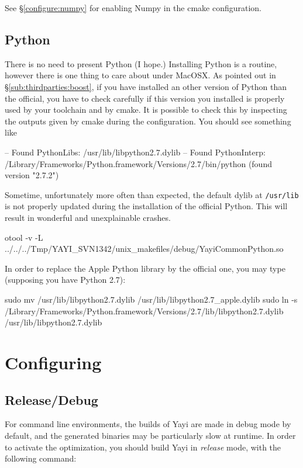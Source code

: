See \S \ref{configure:numpy} for enabling Numpy in the cmake configuration.


\subsection{Python}
\label{sub:python}
There is no need to present Python (I hope.) Installing Python is a routine, however there is one thing to care about under MacOSX. As pointed out in \S \ref{sub:thirdparties:boost}, if you have installed an other version of Python than the official, you have to check carefully if this version you installed is properly used by your toolchain and by cmake. It is possible to check this by inspecting the outputs given by cmake during the configuration. You should see something like

\begin{bash}
-- Found PythonLibs: /usr/lib/libpython2.7.dylib 
-- Found PythonInterp: /Library/Frameworks/Python.framework/Versions/2.7/bin/python (found version "2.7.2")
\end{bash}

Sometime, unfortunately more often than expected, the default dylib at \lstinline|/usr/lib| is not properly updated during the installation of the official Python. This will result in wonderful and unexplainable crashes. 


\begin{bash}
otool -v -L ../../../Tmp/YAYI_SVN1342/unix_makefiles/debug/YayiCommonPython.so
\end{bash}

In order to replace the Apple Python library by the official one, you may type (supposing you have Python 2.7):
\begin{bash}
sudo mv /usr/lib/libpython2.7.dylib /usr/lib/libpython2.7_apple.dylib
sudo ln -s /Library/Frameworks/Python.framework/Versions/2.7/lib/libpython2.7.dylib /usr/lib/libpython2.7.dylib
\end{bash}



\section{Configuring}



\subsection{Release/Debug}
For command line environments, the builds of Yayi are made in debug mode by default, and the generated binaries may be particularly slow at runtime. In order to activate the optimization, you should build Yayi in \textit{release} mode, with the following command:

